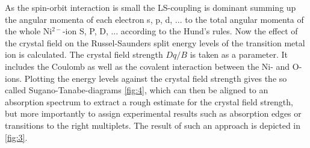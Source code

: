 As the spin-orbit interaction is small the LS-coupling is dominant summing up the angular momenta of each electron s, p, d, ... to the total angular momenta of the whole Ni$^{2-}$-ion S, P, D, ... according to the Hund's rules.
Now the effect of the crystal field on the Russel-Saunders split energy levels of the transition metal ion is calculated.
The crystal field strength $Dq/B$ is taken as a parameter.
It includes the Coulomb as well as the covalent interaction between the Ni- and O-ions.
Plotting the energy levels against the crystal field strength gives the so called Sugano-Tanabe-diagrams \autoref{fig:4}, which can then be aligned to an absorption spectrum to extract a rough estimate for the crystal field strength, but more importantly to assign experimental results such as absorption edges or transitions to the right multiplets.
The result of such an approach is depicted in \autoref{fig:3}.

